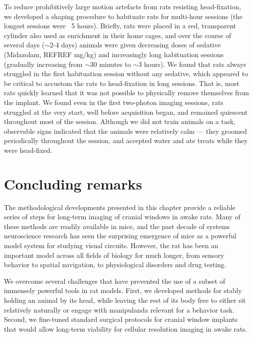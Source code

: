 To reduce prohibitively large motion artefacts from rats resisting head-fixation, we developed a shaping procedure to habituate rats for multi-hour sessions (the longest sessions were ~5 hours). Briefly, rats were placed in a red, transparent cylinder also used as enrichment in their home cages, and over the course of several days ($\sim$2-4 days) animals were given decreasing doses of sedative (Midazolam, REFREF mg/kg) and increasingly long habituation sessions (gradually increasing from $\sim$30 minutes to $\sim$3 hours). We found that rats always struggled in the first habituation session without any sedative, which appeared to be critical to accustom the rats to head-fixation in long sessions. That is, most rats quickly learned that it was not possible to physically remove themselves from the implant. We found even in the first two-photon imaging sessions, rats struggled at the very start, well before acquisition began, and remained quiescent throughout most of the session. Although we did not train animals on a task, observable signs indicated that the animals were relatively calm --- they groomed periodically throughout the session, and accepted water and ate treats while they were head-fixed. 

\section{Concluding remarks}
The methodological developments presented in this chapter provide a reliable series of steps for long-term imaging of cranial windows in awake rats. Many of these methods are readily available in mice, and the past decade of systems neuroscience research has seen the surprising emergence of mice as a powerful model system for studying visual circuits. However, the rat has been an important model across all fields of biology for much longer, from sensory behavior\cite{Lashley1930, REFREF} to spatial navigation\cite{REFREF}, to physiological disorders and drug testing\cite{REFREF}. 

We overcome several challenges that have prevented the use of a subset of immensely powerful tools in rat models. First, we developed methods for stably holding an animal by its head, while leaving the rest of its body free to either sit relatively naturally or engage with manipulanda relevant for a behavior task. Second, we fine-tuned standard surgical protocols for cranial window implants that would allow long-term viability for cellular resolution imaging in awake rats. 

